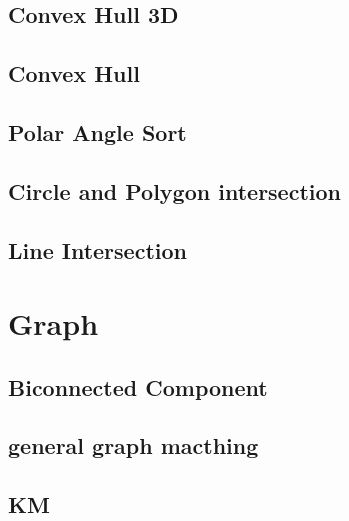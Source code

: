 \documentclass[a4paper,10pt,twocolumn,oneside]{article}
\begin{document}
\subsection{Convex Hull 3D}


\subsection{Convex Hull}


\subsection{Polar Angle Sort}


\subsection{Circle and Polygon intersection}


\subsection{Line Intersection}


\section{Graph}
\subsection{Biconnected Component}


\subsection{general graph macthing}


%

\subsection{KM}

\end{document}
